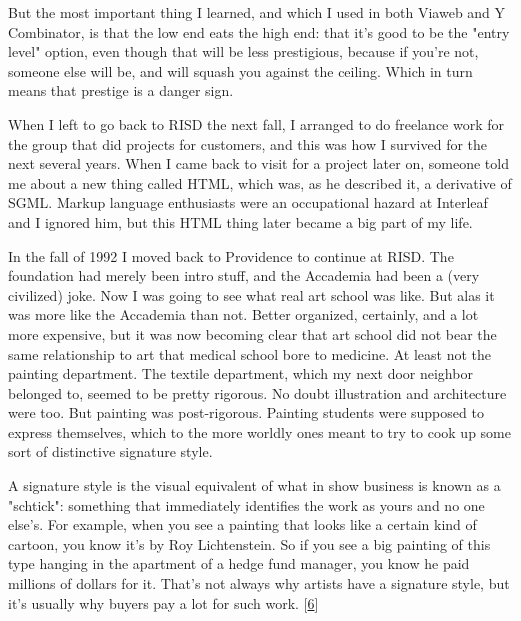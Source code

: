 But the most
                  important thing I learned, and which I used in both Viaweb and
                  Y Combinator, is that the low end eats the high end: that it's
                  good to be the "entry level" option, even though that will be
                  less prestigious, because if you're not, someone else will be,
                  and will squash you against the ceiling. Which in turn means
                  that prestige is a danger sign.

When I left to go
                  back to RISD the next fall, I arranged to do freelance work
                  for the group that did projects for customers, and this was
                  how I survived for the next several years. When I came back to
                  visit for a project later on, someone told me about a new
                  thing called HTML, which was, as he described it, a derivative
                  of SGML. Markup language enthusiasts were an occupational
                  hazard at Interleaf and I ignored him, but this HTML thing
                  later became a big part of my life.

In the fall of
                  1992 I moved back to Providence to continue at RISD. The
                  foundation had merely been intro stuff, and the Accademia had
                  been a (very civilized) joke. Now I was going to see what real
                  art school was like. But alas it was more like the Accademia
                  than not. Better organized, certainly, and a lot more
                  expensive, but it was now becoming clear that art school did
                  not bear the same relationship to art that medical school bore
                  to medicine. At least not the painting department. The textile
                  department, which my next door neighbor belonged to, seemed to
                  be pretty rigorous. No doubt illustration and architecture
                  were too. But painting was post-rigorous. Painting students
                  were supposed to express themselves, which to the more worldly
                  ones meant to try to cook up some sort of distinctive
                  signature style.

A signature style is the visual
                  equivalent of what in show business is known as a "schtick":
                  something that immediately identifies the work as yours and no
                  one else's. For example, when you see a painting that looks
                  like a certain kind of cartoon, you know it's by Roy
                  Lichtenstein. So if you see a big painting of this type
                  hanging in the apartment of a hedge fund manager, you know he
                  paid millions of dollars for it. That's not always why artists
                  have a signature style, but it's usually why buyers pay a lot
                  for such work.
                  [\href{\#f6n}{6}]

